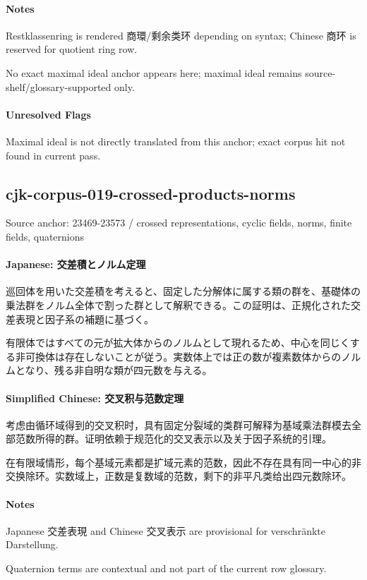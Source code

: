 \documentclass[11pt]{article}
\begin{document}
\paragraph{Notes}
Restklassenring is rendered 商環/剩余类环 depending on syntax; Chinese 商环 is reserved for quotient ring row.\par
No exact maximal ideal anchor appears here; maximal ideal remains source-shelf/glossary-supported only.\par
\paragraph{Unresolved Flags}
Maximal ideal is not directly translated from this anchor; exact corpus hit not found in current pass.\par
\subsection*{cjk-corpus-019-crossed-products-norms}
Source anchor: 23469-23573 / crossed representations, cyclic fields, norms, finite fields, quaternions
\par
\paragraph{Japanese: 交差積とノルム定理}
巡回体を用いた交差積を考えると、固定した分解体に属する類の群を、基礎体の乗法群をノルム全体で割った群として解釈できる。この証明は、正規化された交差表現と因子系の補題に基づく。\par
有限体ではすべての元が拡大体からのノルムとして現れるため、中心を同じくする非可換体は存在しないことが従う。実数体上では正の数が複素数体からのノルムとなり、残る非自明な類が四元数を与える。\par
\paragraph{Simplified Chinese: 交叉积与范数定理}
考虑由循环域得到的交叉积时，具有固定分裂域的类群可解释为基域乘法群模去全部范数所得的群。证明依赖于规范化的交叉表示以及关于因子系统的引理。\par
在有限域情形，每个基域元素都是扩域元素的范数，因此不存在具有同一中心的非交换除环。实数域上，正数是复数域的范数，剩下的非平凡类给出四元数除环。\par
\paragraph{Notes}
Japanese 交差表現 and Chinese 交叉表示 are provisional for verschränkte Darstellung.\par
Quaternion terms are contextual and not part of the current row glossary.\par
\end{document}
